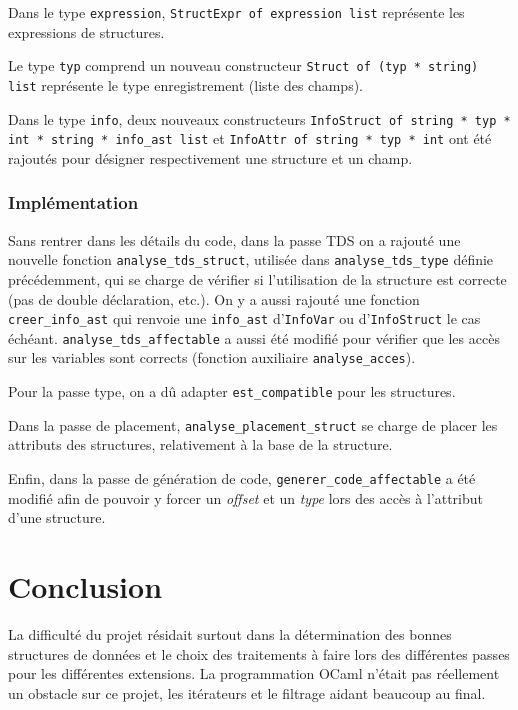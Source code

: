 \documentclass[headings=standardclasses,parskip=half]{scrartcl}
\begin{document}
Dans le type \texttt{expression}, \texttt{StructExpr of expression list}
représente les expressions de structures.

Le type \texttt{typ} comprend un nouveau constructeur
\texttt{Struct of (typ * string) list} représente le type enregistrement
(liste des champs).

Dans le type \texttt{info}, deux nouveaux constructeurs
\texttt{InfoStruct of string * typ * int * string * info\_ast list} et
\texttt{InfoAttr of string * typ * int}
ont été rajoutés pour désigner respectivement une structure et un champ.

\subsubsection*{Implémentation}

Sans rentrer dans les détails du code, dans la passe TDS on a rajouté
une nouvelle fonction \texttt{analyse\_tds\_struct}, utilisée dans
\texttt{analyse\_tds\_type} définie précédemment, qui se charge de
vérifier si l'utilisation de la structure est correcte (pas de double
déclaration, etc.). On y a aussi rajouté une fonction
\texttt{creer\_info\_ast} qui renvoie une \texttt{info\_ast}
d'\texttt{InfoVar} ou d'\texttt{InfoStruct} le cas échéant.
\texttt{analyse\_tds\_affectable} a aussi été modifié pour vérifier
que les accès sur les variables sont corrects (fonction auxiliaire
\texttt{analyse\_acces}).

Pour la passe type, on a dû adapter \texttt{est\_compatible}
pour les structures.

Dans la passe de placement, \texttt{analyse\_placement\_struct} se
charge de placer les attributs des structures, relativement à la base
de la structure.

Enfin, dans la passe de génération de code,
\texttt{generer\_code\_affectable} a été modifié afin de pouvoir
y forcer un \textit{offset} et un \textit{type} lors des accès
à l'attribut d'une structure.

\section{Conclusion}

La difficulté du projet résidait surtout dans la détermination des
bonnes structures de données et le choix des traitements à faire
lors des différentes passes pour les différentes extensions.
La programmation OCaml n'était pas réellement un obstacle
sur ce projet, les itérateurs et le filtrage aidant beaucoup au
final.
\end{document}
